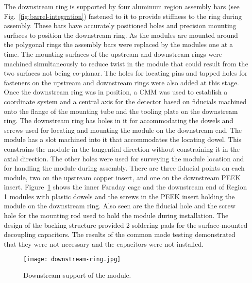 The downstream ring is supported by four aluminum region assembly bars (see Fig.~\ref{fig:barrel-integration}) fastened to it to provide stiffness to the ring during assembly. These bars have accurately positioned holes and precision mounting surfaces to position the downstream ring. As the modules are mounted around the polygonal rings the assembly bars were replaced by the modules one at a time. The mounting surfaces of the upstream and downstream rings were machined simultaneously to reduce twist in the module that could result from the two surfaces not being co-planar. The holes for locating pins and tapped holes for fasteners on the upstream and downstream rings were also added at this stage. Once the downstream ring was in position, a CMM was used to establish a coordinate system and a central axis for the detector based on fiducials machined onto the flange of the mounting tube and the tooling plate on the downstream ring. The downstream ring has holes in it for accommodating the dowels and screws used for locating and mounting the module on the downstream end. The module has a slot machined into it that accommodates the locating dowel. This constrains the module in the tangential direction without constraining it in the axial direction. 
The other holes were used for surveying the module location and for handling the module during assembly. There are three fiducial points on each module, two on the upstream copper insert, and one on the downstream PEEK insert. Figure~\ref{fig:downstream-ring} shows the inner Faraday cage and the downstream end of Region 1 modules with plastic dowels and the screws in the PEEK insert holding the module on the downstream ring. Also seen are the fiducial hole and the screw hole for the mounting rod used to hold the module during installation. The design of the backing structure provided 2 soldering pads for the surface-mounted decoupling capacitors. The results of the common mode testing demonstrated that they were not necessary and the capacitors were not installed.

\begin{figure}[hbt] 
\centering 
\texttt{[image: downstream-ring.jpg]}
\caption{Downstream support of the module.}
\label{fig:downstream-ring}
\end{figure}


